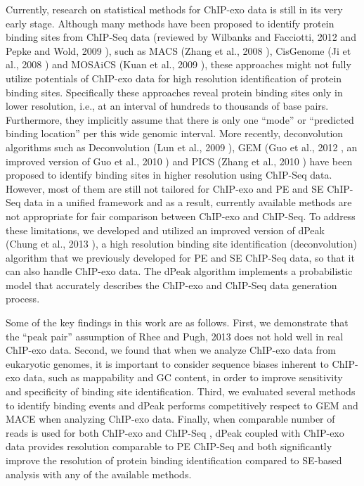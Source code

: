 \documentclass{bmcart}\usepackage[]{graphicx}\usepackage[]{color}
\begin{document}
Currently, research on statistical methods for ChIP-exo data is still
in its very early stage. Although many methods have been proposed to
identify protein binding sites from ChIP-Seq data (reviewed by
Wilbanks and Facciotti, 2012 \cite{evaluation} and Pepke and Wold,
2009 \cite{computation}), such as MACS (Zhang et al., 2008
\cite{macs}), CisGenome (Ji et al., 2008 \cite{cisgenome}) and MOSAiCS
(Kuan et al., 2009 \cite{mosaics}), these approaches might not fully
utilize potentials of ChIP-exo data for high resolution identification
of protein binding sites. Specifically these approaches reveal protein
binding sites only in lower resolution, i.e., at an interval of
hundreds to thousands of base pairs. Furthermore, they implicitly
assume that there is only one ``mode'' or ``predicted binding
location'' per this wide genomic interval. More recently,
deconvolution algorithms such as Deconvolution (Lun et al., 2009
\cite{csdeconv}), GEM (Guo et al., 2012 \cite{gem}, an improved
version of Guo et al., 2010 \cite{gps} ) and PICS (Zhang et al., 2010
\cite{pics}) have been proposed to identify binding sites in higher
resolution using ChIP-Seq data. However, most of them are still not
tailored for ChIP-exo and PE and SE ChIP-Seq data in a unified
framework and as a result, currently available methods are not
appropriate for fair comparison between ChIP-exo and ChIP-Seq. To
address these limitations, we developed and utilized an improved
version of dPeak (Chung et al., 2013 \cite{dpeak}), a high resolution
binding site identification (deconvolution) algorithm that we
previously developed for PE and SE ChIP-Seq data, so that it can also
handle ChIP-exo data. The dPeak algorithm implements a probabilistic
model that accurately describes the ChIP-exo and ChIP-Seq data
generation process.

Some of the key findings in this work are as follows. First, we
demonstrate that the ``peak pair'' assumption of Rhee and Pugh, 2013
\cite{exo2} does not hold well in real ChIP-exo data. Second, we found
that when we analyze ChIP-exo data from eukaryotic genomes, it is
important to consider sequence biases inherent to ChIP-exo data, such
as mappability and GC content, in order to improve sensitivity and
specificity of binding site identification. Third, we evaluated
several methods to identify binding events and dPeak performs
competitively respect to GEM and MACE when analyzing ChIP-exo
data. Finally, when comparable number of reads is used for both
ChIP-exo and ChIP-Seq , dPeak coupled with ChIP-exo data provides
resolution comparable to PE ChIP-Seq and both significantly improve
the resolution of protein binding identification compared to SE-based
analysis with any of the available methods.
\end{document}
